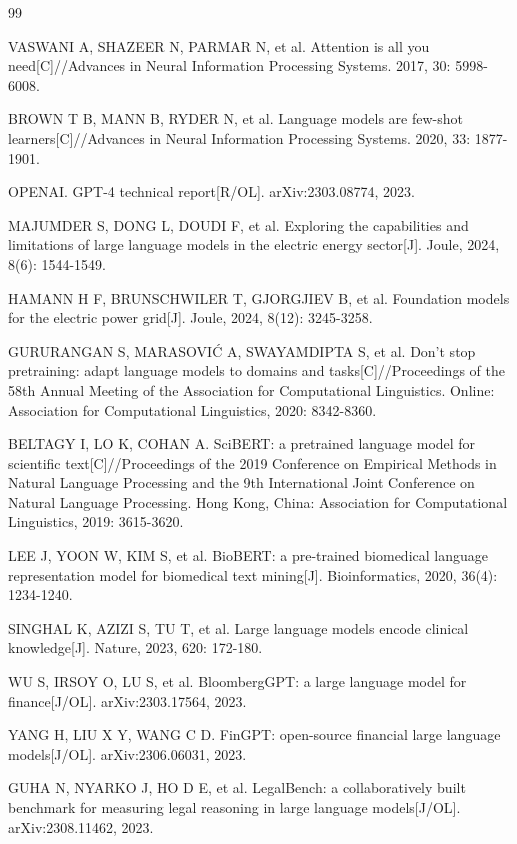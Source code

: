 \documentclass[fontset=fandol,type=master,campus=shenzhen,etitleauto=true]{hithesisbook}
\begin{document}
\begin{thebibliography}{99}

 VASWANI A, SHAZEER N, PARMAR N, et al. Attention is all you need[C]//Advances in Neural Information Processing Systems. 2017, 30: 5998-6008.

 BROWN T B, MANN B, RYDER N, et al. Language models are few-shot learners[C]//Advances in Neural Information Processing Systems. 2020, 33: 1877-1901.

 OPENAI. GPT-4 technical report[R/OL]. arXiv:2303.08774, 2023.

 MAJUMDER S, DONG L, DOUDI F, et al. Exploring the capabilities and limitations of large language models in the electric energy sector[J]. Joule, 2024, 8(6): 1544-1549.

 HAMANN H F, BRUNSCHWILER T, GJORGJIEV B, et al. Foundation models for the electric power grid[J]. Joule, 2024, 8(12): 3245-3258.

 GURURANGAN S, MARASOVIĆ A, SWAYAMDIPTA S, et al. Don't stop pretraining: adapt language models to domains and tasks[C]//Proceedings of the 58th Annual Meeting of the Association for Computational Linguistics. Online: Association for Computational Linguistics, 2020: 8342-8360.

 BELTAGY I, LO K, COHAN A. SciBERT: a pretrained language model for scientific text[C]//Proceedings of the 2019 Conference on Empirical Methods in Natural Language Processing and the 9th International Joint Conference on Natural Language Processing. Hong Kong, China: Association for Computational Linguistics, 2019: 3615-3620.

 LEE J, YOON W, KIM S, et al. BioBERT: a pre-trained biomedical language representation model for biomedical text mining[J]. Bioinformatics, 2020, 36(4): 1234-1240.

 SINGHAL K, AZIZI S, TU T, et al. Large language models encode clinical knowledge[J]. Nature, 2023, 620: 172-180.

 WU S, IRSOY O, LU S, et al. BloombergGPT: a large language model for finance[J/OL]. arXiv:2303.17564, 2023.

 YANG H, LIU X Y, WANG C D. FinGPT: open-source financial large language models[J/OL]. arXiv:2306.06031, 2023.

 GUHA N, NYARKO J, HO D E, et al. LegalBench: a collaboratively built benchmark for measuring legal reasoning in large language models[J/OL]. arXiv:2308.11462, 2023.


\end{thebibliography}
\end{document}
